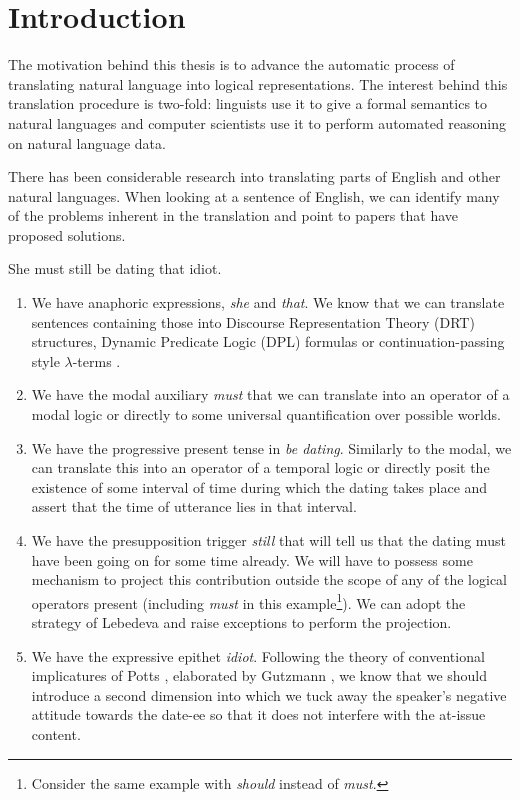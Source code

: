 \chapter*{Introduction}

The motivation behind this thesis is to advance the automatic process of
translating natural language into logical representations. The interest
behind this translation procedure is two-fold: linguists use it to give a
formal semantics to natural languages and computer scientists use it to
perform automated reasoning on natural language data.

There has been considerable research into translating parts of English and
other natural languages. When looking at a sentence of English, we can
identify many of the problems inherent in the translation and point to
papers that have proposed solutions.

\begin{exe}
  \ex She must still be dating that idiot.
\end{exe}

\begin{enumerate}
  \item \label{item:first-feature} We have anaphoric expressions,
    \emph{she} and \emph{that}. We know that we can translate sentences
    containing those into Discourse Representation Theory (DRT)
    \cite{kamp1993discourse} structures, Dynamic Predicate Logic (DPL)
    \cite{groenendijk1991dynamic} formulas or continuation-passing style
    $\lambda$-terms \cite{de2006towards}.
  \item We have the modal auxiliary \emph{must} that we can translate into
    an operator of a modal logic or directly to some universal
    quantification over possible worlds.
  \item We have the progressive present tense in \emph{be
    dating}. Similarly to the modal, we can translate this into an operator
    of a temporal logic or directly posit the existence of some interval of
    time during which the dating takes place and assert that the time of
    utterance lies in that interval.
  \item We have the presupposition trigger \emph{still} that will tell us
    that the dating must have been going on for some time already. We will
    have to possess some mechanism to project this contribution outside the
    scope of any of the logical operators present (including \emph{must} in
    this example\footnote{Consider the same example with \emph{should}
      instead of \emph{must}.}). We can adopt the strategy of Lebedeva
    \cite{lebedeva2012expression} and raise exceptions to perform the
    projection.
  \item \label{item:last-feature} We have the expressive epithet
    \emph{idiot}. Following the theory of conventional implicatures of
    Potts \cite{potts2005logic}, elaborated by Gutzmann
    \cite{gutzmann2015use}, we know that we should introduce a second
    dimension into which we tuck away the speaker's negative attitude
    towards the date-ee so that it does not interfere with the at-issue
    content.
\end{enumerate}

